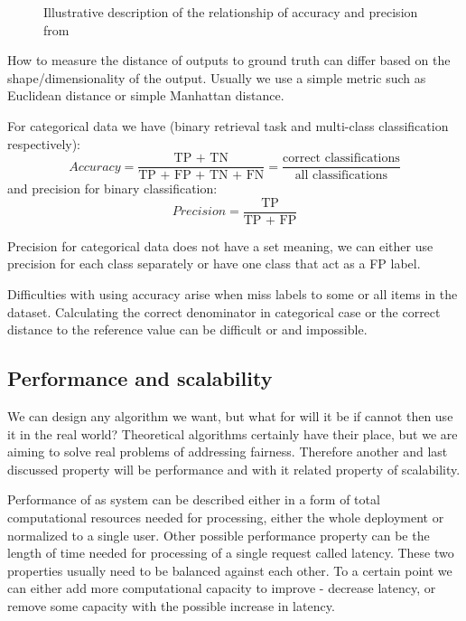 \begin{figure}[htbp]
    \centering
    
    \caption{Illustrative description of the relationship of accuracy and precision from \cite{Accuracy_precision}}
    \label{fig:accuracy_fairness}
\end{figure}

How to measure the distance of outputs to ground truth can differ based on the shape/dimensionality of the output. Usually we use a simple metric such as Euclidean distance or simple Manhattan distance.


For categorical data we have (binary retrieval task and multi-class classification respectively):
\begin{equation}
    Accuracy = \dfrac{\text{TP + TN}}{\text{TP + FP + TN + FN}} = \dfrac{\text{correct classifications}}{\text{all classifications}}
\end{equation}
and precision for binary classification:
\begin{equation}
    Precision = \dfrac{\text{TP}}{\text{TP + FP}}
\end{equation}

Precision for categorical data does not have a set meaning, we can either use precision for each class separately or have one class that act as a FP label.

Difficulties with using accuracy arise when miss labels to some or all items in the dataset. Calculating the correct denominator in categorical case or the correct distance to the reference value can be difficult or and impossible.

\subsection{Performance and scalability}
We can design any algorithm we want, but what for will it be if cannot then use it in the real world? Theoretical algorithms certainly have their place, but we are aiming to solve real problems of addressing fairness. Therefore another and last discussed property will be performance and with it related property of scalability.

Performance of as system can be described either in a form of total computational resources needed for processing, either the whole deployment or normalized to a single user. Other possible performance property can be the length of time needed for processing of a single request called latency. These two properties usually need to be balanced against each other. To a certain point we can either add more computational capacity to improve - decrease latency, or remove some capacity with the possible increase in latency.

